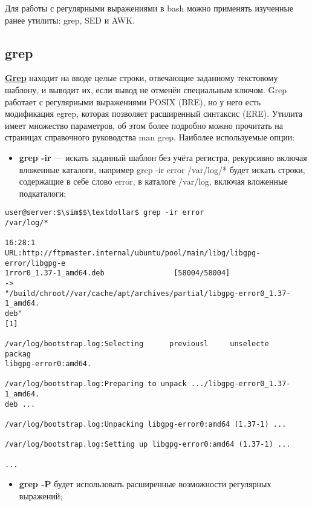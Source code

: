 \documentclass[14pt, a4paper]{article}
\begin{document}
Для работы с регулярными выражениями в bash можно применять изученные ранее утилиты: grep,
SED и AWK.

\subsection*{grep} 

\href{https://ru.wikipedia.org/wiki/Grep}{\textbf{Grep}} находит на вводе целые строки, отвечающие заданному текстовому шаблону, и выводит их, если
вывод не отменён специальным ключом. Grep работает с регулярными выражениями POSIX (BRE),
но у него есть модификация egrep, которая позволяет расширенный синтаксис (ERE). Утилита имеет
множество параметров, об этом более подробно можно прочитать на страницах справочного
руководства man grep. Наиболее используемые опции:

\begin{itemize}
    \item \textbf{grep -ir} — искать заданный шаблон без учёта регистра, рекурсивно включая вложенные
    каталоги, например \colorbox{backcolour}{grep -ir error /var/log/*} будет искать строки, содержащие в себе
    слово error, в каталоге /var/log, включая вложенные подкаталоги;
\end{itemize}

\begin{lstlisting}
user@server:$\sim$$\textdollar$ grep -ir error
/var/log/*
                                                                  16:28:1
URL:http://ftpmaster.internal/ubuntu/pool/main/libg/libgpg-error/libgpg-e
1rror0_1.37-1_amd64.deb                [58004/58004]                    ->
"/build/chroot//var/cache/apt/archives/partial/libgpg-error0_1.37-1_amd64.
deb"
[1]

/var/log/bootstrap.log:Selecting      previousl     unselecte     packag
libgpg-error0:amd64.

/var/log/bootstrap.log:Preparing to unpack .../libgpg-error0_1.37-1_amd64.
deb ...

/var/log/bootstrap.log:Unpacking libgpg-error0:amd64 (1.37-1) ...

/var/log/bootstrap.log:Setting up libgpg-error0:amd64 (1.37-1) ...

...
\end{lstlisting}

\begin{itemize}
    \item \textbf{grep -P} будет использовать расширенные возможности регулярных выражений;
\end{itemize}
\end{document}
